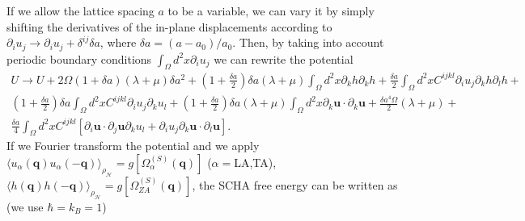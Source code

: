If we allow the lattice spacing $a$ to be a variable, we can vary it by simply shifting the derivatives of the 
in-plane displacements according to $\partial_{i}u_{j}\rightarrow\partial_{i}u_{j}+\delta^{ij}\delta a$, where
$\delta a=(a-a_{0})/a_{0}$. Then, by taking into account periodic boundary conditions 
$\int_{\Omega}{d^{2}x\partial_{i}u_{j}}$ we can rewrite the potential
\begin{multline}
 \label{deltaa-potential}
 U\rightarrow U+2\Omega(1+\delta a)(\lambda+\mu)\delta a^{2}+(1+\frac{\delta a}{2})\delta a(\lambda+\mu)\int_{\Omega}{d^{2}x\partial_{k}h\partial_{k}h}+\frac{\delta a}{2}\int_{\Omega}{d^{2}xC^{ijkl}\partial_{i}u_{j}\partial_{k}h\partial_{
 l}h}+\\(1+\frac{\delta a}{2})\delta a\int_{\Omega}{d^{2}xC^{ijkl}\partial_{i}u_{j}\partial_{k}u_{l}}+(1+\frac{\delta a}{2})\delta a(\lambda+\mu)\int_{\Omega}{d^{2}x\partial_{k}\boldsymbol{
 u}\cdot\partial_{k}\boldsymbol{u}}+\frac{\delta a^{4}\Omega}{2}(\lambda+\mu)+\\\frac{\delta a}{4}\int_{\Omega}{d^{2}xC^{ijkl}[\partial_{i}\boldsymbol{u}\cdot\partial_{j}\boldsymbol{u}\partial_{k}u_{l}+\partial_{
 i}u_{j}\partial_{k}\boldsymbol{u}\cdot\partial_{l}\boldsymbol{u}]}.
\end{multline}
If we Fourier transform the potential and we apply $\langle u_{\alpha}(\boldsymbol{q})u_{\alpha}(-\boldsymbol{q})\rangle_{\rho_{\mathcal{H}}}=g[\Omega_{\alpha}^{(S)}(\boldsymbol{q})]$ ($\alpha=$LA,TA), $\langle h(\boldsymbol{q})h(-\boldsymbol{q})\rangle_{\rho_{\mathcal{H}}}=g[\Omega_{ZA}^{(S)}(\boldsymbol{q})]$, the SCHA free energy can be written 
as (we use $\hbar=k_{B}=1$)
